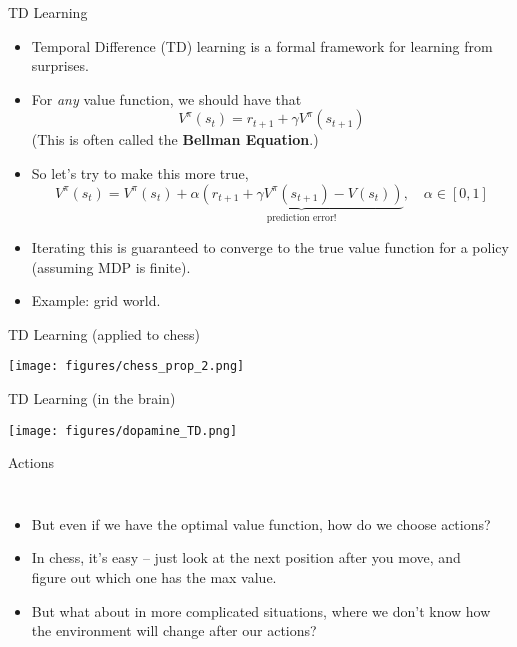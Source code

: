 \documentclass[handout]{beamer} %
\begin{document}
\begin{frame}{TD Learning}
\begin{itemize}
    \item<1-> Temporal Difference (TD) learning is a formal framework for learning from surprises. 
    \item<2-> For \emph{any} value function, we should have that
        \[V^{\pi}(s_{t}) = r_{t+1} + \gamma V^{\pi}(s_{t+1})\] 
        (This is often called the \textbf{Bellman Equation}.)
    \item<3-> So let's try to make this more true, 
        \[V^{\pi}(s_t) = V^{\pi}(s_t) + \alpha \underbrace{\left( r_{t+1} + \gamma V^{\pi}(s_{t+1}) - V(s_t)\right)}_{\text{prediction error!}}, \quad \alpha \in [0, 1]\]
    \item<4-> Iterating this is guaranteed to converge to the true value function for a policy (assuming MDP is finite).
    \item<5-> Example: grid world.
\end{itemize}
\end{frame}

\begin{frame}{TD Learning (applied to chess)}
\begin{center}
%
%
\texttt{[image: figures/chess\_prop\_2.png]}
\end{center}
\end{frame}

\begin{frame}{TD Learning (in the brain)}

\begin{center}
\texttt{[image: figures/dopamine\_TD.png]}
\end{center}
\end{frame}

\begin{frame}{Actions}
\begin{columns}
\begin{itemize}
    \item<1-> But even if we have the optimal value function, how do we choose actions? 
    \item<2-> In chess, it's easy -- just look at the next position after you move, and figure out which one has the max value.
    \item<3-> But what about in more complicated situations, where we don't know how the environment will change after our actions?
\end{itemize}
    \begin{center}
    \end{center}
\end{columns}
\end{frame}
\end{document}
